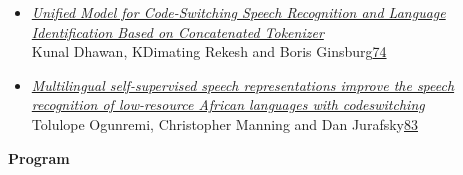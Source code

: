 \documentclass[11pt,oneside]{book}
\begin{document}
\begin{itemize}[leftmargin=*,label={}]
       \item \hyperlink{page.74}{\emph{Unified Model for Code-Switching Speech Recognition and Language Identification Based on Concatenated Tokenizer}}\\ \hspace*{2em} Kunal Dhawan, KDimating Rekesh and Boris Ginsburg\dotfill \hyperlink{page.74}{74}
       \item \hyperlink{page.83}{\emph{Multilingual self-supervised speech representations improve the speech recognition of low-resource African languages with codeswitching}}\\ \hspace*{2em} Tolulope Ogunremi, Christopher Manning and Dan Jurafsky\dotfill \hyperlink{page.83}{83}
  \end{itemize}
\newpage

{}
\renewcommand{\baselinestretch}{0.87}
\setlength{\parindent}{0in}
\setlength{\parskip}{2ex}

\begin{center}
{\Large \textbf{Program}}
\end{center}
\vspace*{0.5em}
\end{document}

